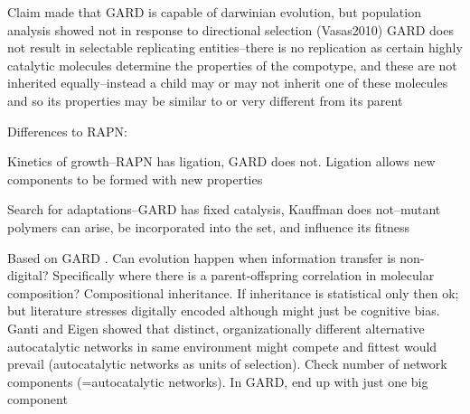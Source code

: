 \begin{NOTES}
Claim made that GARD is capable of darwinian evolution, but population analysis showed not in response to directional selection (Vasas2010) \parencite{Vasas2015, Vasas2012, Vasas2012a}
GARD does not result in selectable replicating entities--there is no replication as certain highly catalytic molecules determine the properties of the compotype, and these are not inherited equally--instead a child may or may not inherit one of these molecules and so its properties may be similar to or very different from its parent \parencite{Vasas2015, Vasas2012, Vasas2012a}

Differences to RAPN:
\begin{compactitem}
	\item Kinetics of growth--RAPN has ligation, GARD does not. Ligation allows new components to be formed with new properties
	\item Search for adaptations--GARD has fixed catalysis, Kauffman does not--mutant polymers can arise, be incorporated into the set, and influence its fitness
\end{compactitem}

\parencite{Vasas2015, Vasas2012, Vasas2012a}
Based on GARD \parencite{Segre1998}. Can evolution happen when information transfer is non-digital? Specifically where there is a parent-offspring correlation in molecular composition? Compositional inheritance. If inheritance is statistical only then ok; but literature stresses digitally encoded although might just be cognitive bias. Ganti and Eigen showed that distinct, organizationally different alternative autocatalytic networks in same environment might compete and fittest would prevail (\eg autocatalytic networks as units of selection).	Check number of network components (=autocatalytic networks). In GARD, end up with just one big component

%	
%
\end{NOTES}

